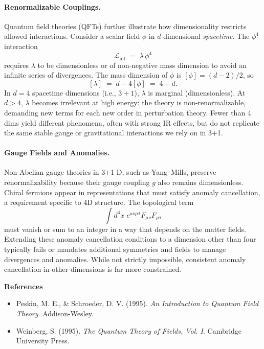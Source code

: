 \begin{technical}
    \paragraph{Renormalizable Couplings.}
    Quantum field theories (QFTs) further illustrate how dimensionality restricts allowed interactions. Consider a scalar field $\phi$ in $d$-dimensional \emph{spacetime}. The $\phi^4$ interaction 
    $$
    \mathcal{L}_{\mathrm{int}} \;=\; \lambda\,\phi^4
    $$
    requires $\lambda$ to be dimensionless or of non-negative mass dimension to avoid an infinite series of divergences. The mass dimension of $\phi$ is $[\phi] = (d - 2)/2$, so
    $$
    [\lambda] \;=\; d - 4[\phi] \;=\; 4 - d.
    $$
    In $d=4$ spacetime dimensions (i.e., $3+1$), $\lambda$ is marginal (dimensionless). At $d>4$, $\lambda$ becomes irrelevant at high energy: the theory is non-renormalizable, demanding new terms for each new order in perturbation theory. Fewer than 4 dims yield different phenomena, often with strong IR effects, but do not replicate the same stable gauge or gravitational interactions we rely on in 3+1.
    
    \paragraph{Gauge Fields and Anomalies.}
    Non-Abelian gauge theories in 3+1 D, such as Yang–Mills, preserve renormalizability because their gauge coupling $g$ also remains dimensionless. Chiral fermions appear in representations that must satisfy anomaly cancellation, a requirement specific to 4D structure. The topological term
    $$
    \int d^4 x \;\epsilon^{\mu\nu\rho\sigma} F_{\mu\nu} F_{\rho\sigma}
    $$
    must vanish or sum to an integer in a way that depends on the matter fields. Extending these anomaly cancellation conditions to a dimension other than four typically fails or mandates additional symmetries and fields to manage divergences and anomalies. While not strictly impossible, consistent anomaly cancellation in other dimensions is far more constrained.

    
    \vspace{0.5em}
    \noindent
    \textbf{References}
    \begin{itemize}
    \setlength\itemsep{0.25em}
    \item Peskin, M. E., \& Schroeder, D. V. (1995). \emph{An Introduction to Quantum Field Theory}. Addison-Wesley.
    \item Weinberg, S. (1995). \emph{The Quantum Theory of Fields, Vol. I}. Cambridge University Press.
    \end{itemize}
    
\end{technical}
    